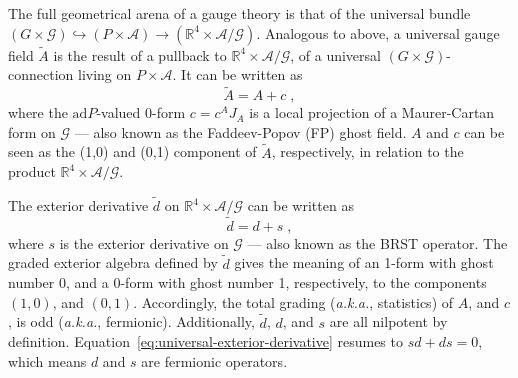 \documentclass[../main/tex]{subfiles}
\begin{document}
The full geometrical arena of a gauge theory is that of the universal bundle $\left( G\times\mathcal{G} \right) \hookrightarrow \left( P \times \mathcal{A} \right) \rightarrow \left( \mathbb{R}^4\times\mathcal{A}/\mathcal{G} \right)$. Analogous to above, a universal gauge field $\tilde{A}$ is the result of a pullback to $\mathbb{R}^4 \times \mathcal{A}/\mathcal{G}$, of a universal $\left( G \times \mathcal{G} \right)$-connection living on $P \times \mathcal{A}$. It can be written as
\begin{equation}
  \tilde{A} = A + c \;,
\end{equation}
where the $\mathrm{ad}P$-valued 0-form $c=c^A J_A$ is a local projection of a Maurer-Cartan form on $ \mathcal{G} $ --- also known as the Faddeev-Popov (FP) ghost field. $A$ and $c$ can be seen as the (1,0) and (0,1) component of $\tilde{A}$, respectively, in relation to the product $\mathbb{R}^4 \times \mathcal{A}/\mathcal{G}$.

The exterior derivative $\tilde{d}$ on $\mathbb{R}^4 \times \mathcal{A}/\mathcal{G}$ can be written as
\begin{equation}\label{eq:universal-exterior-derivative}
  \tilde{d} = d + s \;,
\end{equation}
where $s$ is the exterior derivative on $\mathcal{G}$ --- also known as the BRST operator. The graded exterior algebra defined by $\tilde{d}$ gives the meaning of an 1-form with ghost number 0, and a 0-form with ghost number 1, respectively, to the components $ \left( 1,0 \right) $, and $ \left( 0,1 \right) $. Accordingly, the total grading (\textit{a.k.a.}, statistics) of $A$, and $c$, is odd (\textit{a.k.a.}, fermionic). Additionally, $\tilde{d}$, $d$, and $s$ are all nilpotent by definition. Equation~\eqref{eq:universal-exterior-derivative} resumes to $sd+ds=0$, which means $d$ and $s$ are fermionic operators.
\end{document}
